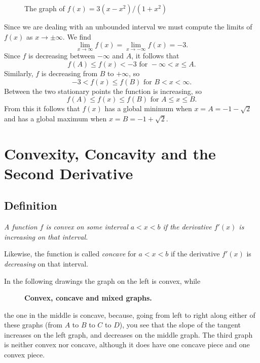 \begin{figure}[h]
  \centering 
  \caption{The graph of $f(x) = 3(x-x^2)/(1+x^2)$}
  \label{fig:05rationalexample}
\end{figure}

Since we are dealing with an unbounded interval we must compute the limits of
$f(x)$ as $x\to\pm\infty$.  We find
\[
\lim_{x\to\infty} f(x) = \lim_{x\to-\infty} f(x) = -3.
\]
Since $f$ is decreasing between $-\infty$ and $A$, it follows that
\[
f(A) \leq f(x) < - 3 \text{ for } -\infty<x\leq A.
\]
Similarly, $f$ is decreasing from $B$ to $+\infty$, so
\[
-3 < f(x) \leq f(B) \text{ for } B < x<\infty.
\]
Between the two stationary points the function is increasing, so
\[
f(A) \leq f(x) \leq f(B) \text{ for } A\leq x\leq B.
\]
From this it follows that $f(x)$ has a global minimum when $x=A=-1-\sqrt{2}$
and has a global maximum when $x=B=-1+\sqrt{2}$.












\section{Convexity, Concavity and the Second Derivative} %

\subsection{Definition} %
\itshape A function $f$ is \emph{convex} on some interval
$a<x<b$ if the derivative $f'(x)$ is \emph{increasing} on that interval.




Likewise, the function is called \emph{concave} for $a<x<b$ if the derivative
$f'(x)$ is \emph{decreasing} on that interval.








\upshape\smallskip




In the following drawings the graph on the left is convex, while
\begin{figure}[h]\centering
  \parbox{115pt}{ }
  \parbox{115pt}{ }
  \parbox{115pt}{ }
  \caption{\textbf{Convex, concave and mixed graphs.}}
  \label{fig:05concave-convex-examples}
\end{figure}
the one in the middle is concave, because, going from left to right along either of
these graphs (from $A$ to $B$ to $C$ to $D$), you see that the slope of the
tangent increases on the left graph, and decreases on the middle graph.
The third graph is neither convex nor concave, although it does have one concave
piece and one convex piece.

